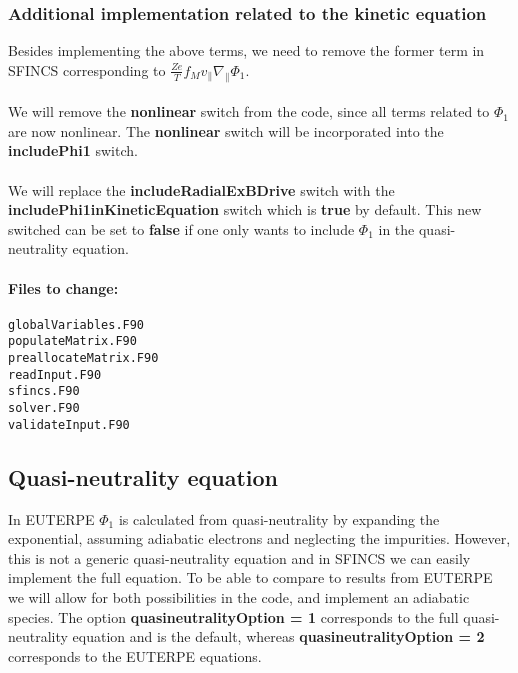 \documentclass[12pt]{article}
\newcommand{\na}{\nabla}
\begin{document}
\subsubsection*{Additional implementation related to the kinetic equation}
Besides implementing the above terms, we need to remove the former term in SFINCS corresponding to $\displaystyle \frac{Z e}{T} f_M v_\| \na_\| \Phi_1$. \\
\\
We will remove the \textbf{nonlinear} switch from the code, since all terms related to $\Phi_1$ are now nonlinear. 
The \textbf{nonlinear} switch will be incorporated into the \textbf{includePhi1} switch.\\
\\
We will replace the \textbf{includeRadialExBDrive} switch with the \textbf{includePhi1inKineticEquation} switch which is \textbf{true} by default. 
This new switched can be set to \textbf{false} if one only wants to include $\Phi_1$ in the quasi-neutrality equation.

\paragraph*{\textbf{Files to change:}}
\begin{verbatim}
globalVariables.F90
populateMatrix.F90
preallocateMatrix.F90
readInput.F90
sfincs.F90
solver.F90
validateInput.F90
\end{verbatim}




\newpage


























\newpage
\subsection*{Quasi-neutrality equation}
In EUTERPE $\Phi_1$ is calculated from quasi-neutrality by expanding the exponential, assuming adiabatic electrons and neglecting the impurities.
However, this is not a generic quasi-neutrality equation and in SFINCS we can easily implement the full equation. 
To be able to compare to results from EUTERPE we will allow for both possibilities in the code, and implement an adiabatic species. 
The option \textbf{quasineutralityOption = 1} corresponds to the full quasi-neutrality equation and is the default, 
whereas \textbf{quasineutralityOption = 2} corresponds to the EUTERPE equations.
\end{document}
